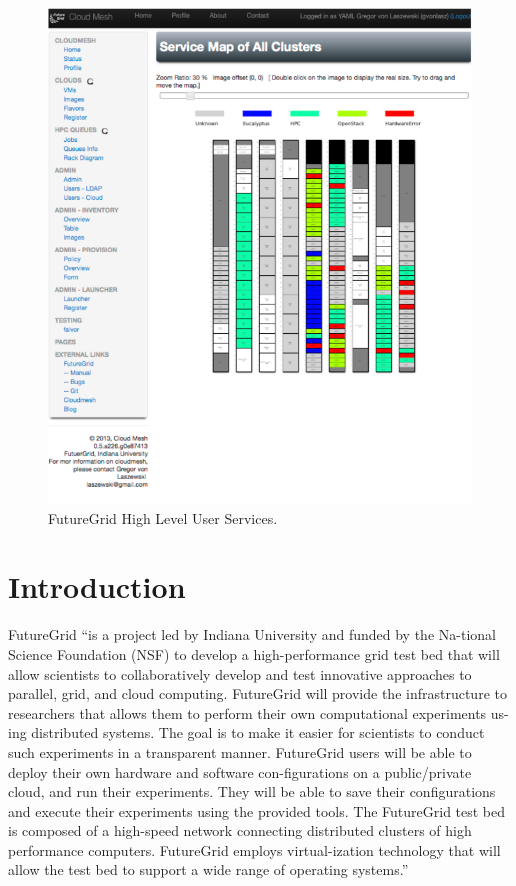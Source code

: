 \documentclass{article}
\begin{document}
\begin{figure}[h!]
  \caption{FutureGrid High Level User Services.}
  \centering
    \includegraphics[width=1.0\textwidth]{images/rainbow}
\end{figure}

\section{Introduction}

FutureGrid \cite{las2010gce,las12fg-bookchapter}“is a project led by Indiana University and funded by the Na-tional Science Foundation (NSF) to develop a high-performance grid test bed that will allow scientists to collaboratively develop and test innovative approaches to parallel, grid, and cloud computing. FutureGrid will provide the infrastructure to researchers that allows them to perform their own computational experiments us-ing distributed systems. The goal is to make it easier for scientists to conduct such experiments in a transparent manner.  FutureGrid users will be able to deploy their own hardware and software con-figurations on a public/private cloud, and run their experiments. They will be able to save their configurations and execute their experiments using the provided tools. The FutureGrid test bed is composed of a high-speed network connecting distributed clusters of high performance computers. FutureGrid employs virtual-ization technology that will allow the test bed to support a wide range of operating systems.”
\end{document}
